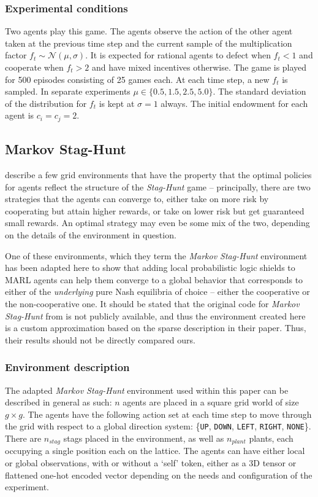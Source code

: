 \subsubsection{Experimental conditions}
Two agents play this game. The agents observe the action of the other agent taken at the previous time step and the current sample of the multiplication factor $f_t\sim \mathcal{N}(\mu, \sigma)$. It is expected for rational agents to defect when $f_t<1$ and cooperate when $f_t>2$ and have mixed incentives otherwise. The game is played for 500 episodes consisting of 25 games each. At each time step, a new $f_t$ is sampled. In separate experiments $\mu\in\{0.5,1.5,2.5,5.0\}$. The standard deviation of the distribution for $f_t$ is kept at $\sigma=1$ always. The initial endowment for each agent is $c_i=c_j=2$. 


\subsection{Markov Stag-Hunt}
\citet{peysakhovich2018prosocial} describe a few grid environments that have the property that the optimal policies for agents reflect the structure of the \textit{Stag-Hunt} game -- principally, there are two strategies that the agents can converge to, either take on more risk by cooperating but attain higher rewards, or take on lower risk but get guaranteed small rewards. An optimal strategy may even be some mix of the two, depending on the details of the environment in question.  

One of these environments, which they term the \textit{Markov Stag-Hunt} environment has been adapted here to show that adding local probabilistic logic shields to MARL agents can help them converge to a global behavior that corresponds to either of the \textit{underlying} pure Nash equilibria of choice -- either the cooperative or the non-cooperative one. It should be stated that the original code for \textit{Markov Stag-Hunt} from \cite{peysakhovich2018prosocial} is not publicly available, and thus the environment created here is a custom approximation based on the sparse description in their paper. Thus, their results should not be directly compared ours.

\subsubsection{Environment description}
The adapted \textit{Markov Stag-Hunt} environment used within this paper can be described in general as such: $n$ agents are placed in a square grid world of size $g\times g$. The agents have the following action set at each time step to move through the grid with respect to a global direction system: \{\texttt{UP}, \texttt{DOWN}, \texttt{LEFT}, \texttt{RIGHT}, \texttt{NONE}\}. There are $n_{stag}$ stags placed in the environment, as well as $n_{plant}$ plants, each occupying a single position each on the lattice. The agents can have either local or global observations, with or without a `self' token, either as a 3D tensor or flattened one-hot encoded vector depending on the needs and configuration of the experiment.

